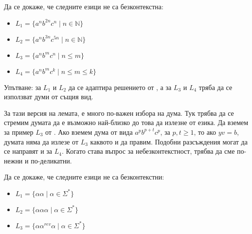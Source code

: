 \begin{problem}
Да се докаже, че следните езици не са безконтекстна:
\begin{itemize}
    \item $L_1 = \{ a^nb^{2n}c^n \mid n \in \mathbb{N} \}$
    \item $L_2 = \{ a^nb^{3n}c^{5n} \mid n \in \mathbb{N} \}$
    \item $L_3 = \{ a^nb^mc^n \mid n \leq m \}$
    \item $L_4 = \{ a^nb^mc^k \mid n \leq m \leq k \}$
\end{itemize}
Упътване: за $L_1$ и $L_2$ да се адаптира решението от , а за $L_3$ и $L_4$ тряба да се използват думи от същия вид.
\end{problem}

\begin{warning}
    За тази версия на лемата, е много по-важен избора на дума.
    Тук трябва да се стремим думата да е възможно най-близко до това да излезне от езика.
    Да вземем за пример $L_3$ от .
    Ако вземем дума от вида $a^pb^{p+t}c^p$, за $p, t \geq 1$, то ако $yv = b$, думата няма да излезе от $L_3$ каквото и да правим.
    Подобни разсъждения могат да се направят и за $L_4$.
    Когато става въпрос за небезконтекстност, трябва да сме по-нежни и по-деликатни.
\end{warning}

\begin{problem}
Да се докаже, че следните езици не са безконтекстни:
\begin{itemize}
    \item $L_1 = \{ \alpha \alpha \mid \alpha \in \Sigma^* \}$
    \item $L_2 = \{ \alpha \alpha \alpha \mid \alpha \in \Sigma^* \}$
    \item $L_3 = \{ \alpha \alpha^{rev} \alpha \mid \alpha \in \Sigma^* \}$
\end{itemize}
\end{problem}